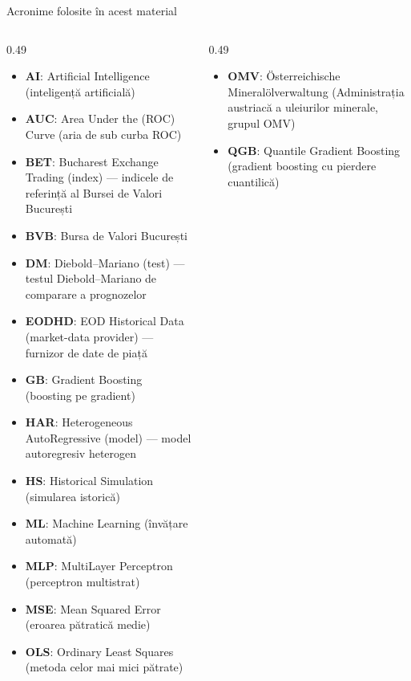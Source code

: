 {
\begin{frame}[noframenumbering]
    \titlepage
\end{frame}
}
\begin{frame}{Acronime folosite în acest material}
\begin{columns}[T]
\begin{column}{0.49\textwidth}
\begin{itemize}\setlength{\itemsep}{0pt}
    \item \textbf{AI}: Artificial Intelligence (inteligență artificială)
    \item \textbf{AUC}: Area Under the (ROC) Curve (aria de sub curba ROC)
    \item \textbf{BET}: Bucharest Exchange Trading (index) — indicele de referință al Bursei de Valori București
    \item \textbf{BVB}: Bursa de Valori București
    \item \textbf{DM}: Diebold–Mariano (test) — testul Diebold–Mariano de comparare a prognozelor
    \item \textbf{EODHD}: EOD Historical Data (market-data provider) — furnizor de date de piață
    \item \textbf{GB}: Gradient Boosting (boosting pe gradient)
    \item \textbf{HAR}: Heterogeneous AutoRegressive (model) — model autoregresiv heterogen
    \item \textbf{HS}: Historical Simulation (simularea istorică)
    \item \textbf{ML}: Machine Learning (învățare automată)
    \item \textbf{MLP}: MultiLayer Perceptron (perceptron multistrat)
    \item \textbf{MSE}: Mean Squared Error (eroarea pătratică medie)
    \item \textbf{OLS}: Ordinary Least Squares (metoda celor mai mici pătrate)
\end{itemize}
\end{column}
\begin{column}{0.49\textwidth}
\begin{itemize}\setlength{\itemsep}{0pt}
    \item \textbf{OMV}: Österreichische Mineralölverwaltung (Administrația austriacă a uleiurilor minerale, grupul OMV)
    \item \textbf{QGB}: Quantile Gradient Boosting (gradient boosting cu pierdere cuantilică)

\end{itemize}
\end{column}
\end{columns}
\end{frame}
